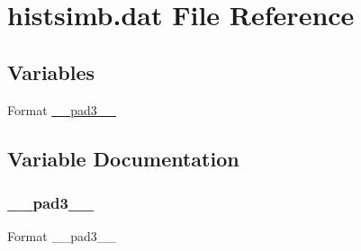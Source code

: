 \hypertarget{histsimb_8dat}{}\section{histsimb.\+dat File Reference}
\label{histsimb_8dat}
\subsection*{Variables}
\begin{DoxyCompactItemize}
\item 
Format \hyperlink{histsimb_8dat_a635218d1d12627ef1a202e84c2df29ca}{\+\_\+\+\_\+pad3\+\_\+\+\_\+}
\end{DoxyCompactItemize}


\subsection{Variable Documentation}
\mbox{\label{histsimb_8dat_a635218d1d12627ef1a202e84c2df29ca}} 
\subsubsection{\texorpdfstring{\+\_\+\+\_\+pad3\+\_\+\+\_\+}{\_\_pad3\_\_}}
{\footnotesize\ttfamily Format \+\_\+\+\_\+pad3\+\_\+\+\_\+}

